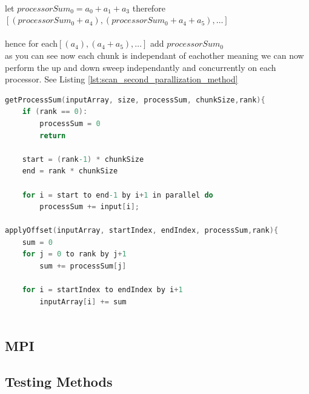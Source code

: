 \\let $processorSum_0 = a_0+a_1+a_3$ therefore\\
$[(processorSum_0+a_4),(processorSum_0 + a_4 +a_5),\dots] $\\\\hence for each$ [(a_4),(a_4 +a_5),\dots]$ add $processorSum_0$\\
as you can see now each chunk is independant of eachother meaning we can now perform the up and down sweep independantly and concurrently on each processor. See Listing \ref{lst:scan_second_parallization_method} 
\begin{lstlisting}[language=C, caption={Serial Sequenctial Scan Algorithm with + operator}, label={lst:scan_second_parallization_method}]
getProcessSum(inputArray, size, processSum, chunkSize,rank){ 
	if (rank == 0):  
		processSum = 0 
		return 
	 
	start = (rank-1) * chunkSize 
	end = rank * chunkSize
	
	for i = start to end-1 by i+1 in parallel do
		processSum += input[i];
	 
applyOffset(inputArray, startIndex, endIndex, processSum,rank){ 
	sum = 0 
	for j = 0 to rank by j+1
		sum += processSum[j] 
		
	for i = startIndex to endIndex by i+1
		inputArray[i] += sum
		
\end{lstlisting}
\subsection{MPI}
\subsection{Testing Methods}

